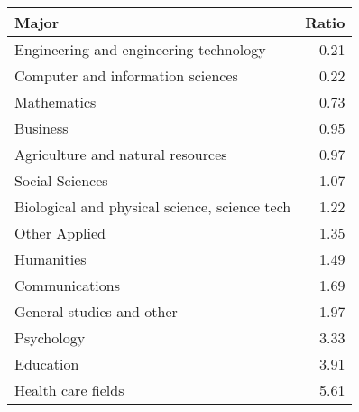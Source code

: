 \begin{tabular}{lr}
\hline
 Major                                         &   Ratio \\
\hline
 Engineering and engineering technology        &    0.21 \\
 Computer and information sciences             &    0.22 \\
 Mathematics                                   &    0.73 \\
 Business                                      &    0.95 \\
 Agriculture and natural resources             &    0.97 \\
 Social Sciences                               &    1.07 \\
 Biological and physical science, science tech &    1.22 \\
 Other Applied                                 &    1.35 \\
 Humanities                                    &    1.49 \\
 Communications                                &    1.69 \\
 General studies and other                     &    1.97 \\
 Psychology                                    &    3.33 \\
 Education                                     &    3.91 \\
 Health care fields                            &    5.61 \\
\hline
\end{tabular}